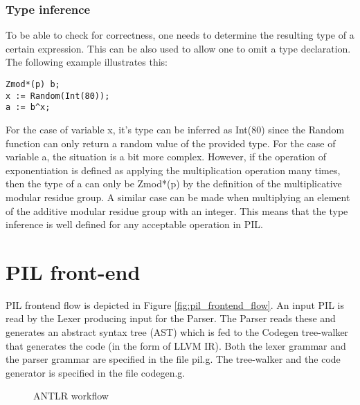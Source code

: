 \subsubsection{Type inference}

To be able to check for correctness, one needs to determine the resulting
type of a certain expression. This can be also used to allow one to omit
a type declaration. The following example illustrates this:
\begin{lstlisting}[language=PIL]
Zmod*(p) b;
x := Random(Int(80));
a := b^x;
\end{lstlisting}
For the case of variable x, it's type can be inferred as Int(80) since
the Random function can only return a random value of the provided
type. For the case of variable a, the situation is a bit more
complex. However, if the operation of exponentiation is defined as
applying the multiplication operation many times, then the type of a
can only be Zmod*(p) by the definition of the multiplicative modular
residue group. A similar case can be made when multiplying an element
of the additive modular residue group with an integer. This means that
the type inference is well defined for any acceptable operation in
PIL.

\section{PIL front-end}
\label{sec:pil_frontend}

PIL frontend flow is depicted in Figure \ref{fig:pil_frontend_flow}.  An
input PIL is read by the Lexer producing input for the Parser. The
Parser reads these and generates an abstract syntax tree (AST) which
is fed to the Codegen tree-walker that generates the code (in the form
of LLVM IR). Both the lexer grammar and the parser grammar are
specified in the file pil.g. The tree-walker and the code generator is
specified in the file codegen.g.

\begin{figure}[hbt!]
  \centering
  \caption{ANTLR workflow}
  \label{fig:antlr_workflow}
\end{figure}


